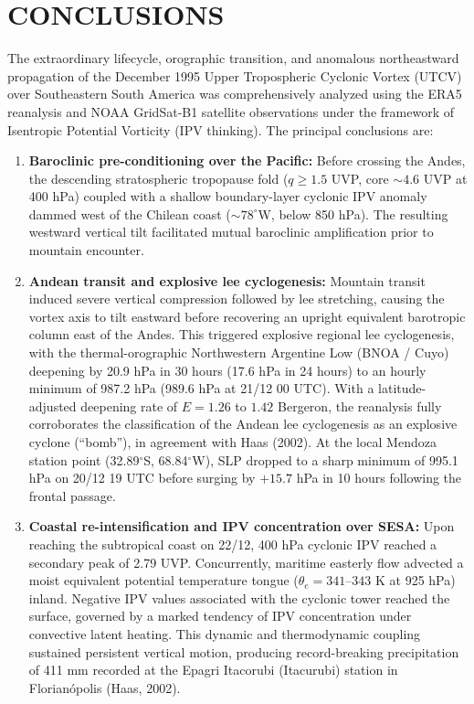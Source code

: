 \documentclass[twocolumn,a4paper,10pt]{article}
\begin{document}
\section{CONCLUSIONS}
The extraordinary lifecycle, orographic transition, and anomalous northeastward propagation of the December 1995 Upper Tropospheric Cyclonic Vortex (UTCV) over Southeastern South America was comprehensively analyzed using the ERA5 reanalysis and NOAA GridSat-B1 satellite observations under the framework of Isentropic Potential Vorticity (IPV thinking). The principal conclusions are:
\begin{enumerate}
    \item \textbf{Baroclinic pre-conditioning over the Pacific:} Before crossing the Andes, the descending stratospheric tropopause fold ($q \ge 1.5$ UVP, core $\sim 4.6$ UVP at 400 hPa) coupled with a shallow boundary-layer cyclonic IPV anomaly dammed west of the Chilean coast ($\sim 78^\circ$W, below 850 hPa). The resulting westward vertical tilt facilitated mutual baroclinic amplification prior to mountain encounter.
    \item \textbf{Andean transit and explosive lee cyclogenesis:} Mountain transit induced severe vertical compression followed by lee stretching, causing the vortex axis to tilt eastward before recovering an upright equivalent barotropic column east of the Andes. This triggered explosive regional lee cyclogenesis, with the thermal-orographic Northwestern Argentine Low (BNOA / Cuyo) deepening by 20.9 hPa in 30 hours (17.6 hPa in 24 hours) to an hourly minimum of 987.2 hPa (989.6 hPa at 21/12 00 UTC). With a latitude-adjusted deepening rate of $E = 1.26$ to $1.42$ Bergeron, the reanalysis fully corroborates the classification of the Andean lee cyclogenesis as an explosive cyclone (``bomb''), in agreement with Haas (2002). At the local Mendoza station point (32.89$^\circ$S, 68.84$^\circ$W), SLP dropped to a sharp minimum of 995.1 hPa on 20/12 19 UTC before surging by $+15.7$ hPa in 10 hours following the frontal passage.
    \item \textbf{Coastal re-intensification and IPV concentration over SESA:} Upon reaching the subtropical coast on 22/12, 400 hPa cyclonic IPV reached a secondary peak of 2.79 UVP. Concurrently, maritime easterly flow advected a moist equivalent potential temperature tongue ($\theta_e = 341$--$343$ K at 925 hPa) inland. Negative IPV values associated with the cyclonic tower reached the surface, governed by a marked tendency of IPV concentration under convective latent heating. This dynamic and thermodynamic coupling sustained persistent vertical motion, producing record-breaking precipitation of 411 mm recorded at the Epagri Itacorubi (Itacurubi) station in Florianópolis (Haas, 2002).

\end{enumerate}
\end{document}
